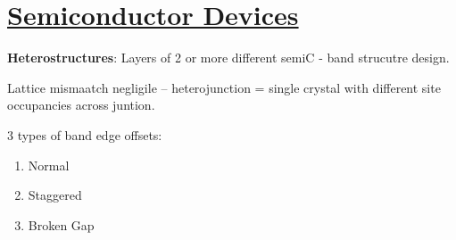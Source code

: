 \section[Semiconductor Devices]{\hyperlink{toc}{Semiconductor Devices}}



\textbf{Heterostructures}: Layers of 2 or more different semiC - band strucutre design.


Lattice mismaatch negligile -- heterojunction = single crystal with different site occupancies across juntion.


3 types of band edge offsets:
\begin{enumerate}
    \item Normal
    \item Staggered
    \item Broken Gap
\end{enumerate}

